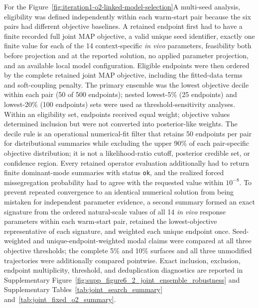 \documentclass[11pt]{article}
\begin{document}
For the Figure~\ref{fig:iteration1-o2-linked-model-selection}A multi-seed analysis, eligibility was defined independently within each warm-start pair because the six pairs had different objective baselines. A retained endpoint first had to have a finite recorded full joint MAP objective, a valid unique seed identifier, exactly one finite value for each of the 14 context-specific \textit{in vivo} parameters, feasibility both before projection and at the reported solution, no applied parameter projection, and an available local model configuration. Eligible endpoints were then ordered by the complete retained joint MAP objective, including the fitted-data terms and soft-coupling penalty. The primary ensemble was the lowest objective decile within each pair (50 of 500 endpoints); nested lowest-5\% (25 endpoints) and lowest-20\% (100 endpoints) sets were used as threshold-sensitivity analyses. Within an eligibility set, endpoints received equal weight; objective values determined inclusion but were not converted into posterior-like weights. The decile rule is an operational numerical-fit filter that retains 50 endpoints per pair for distributional summaries while excluding the upper 90\% of each pair-specific objective distribution; it is not a likelihood-ratio cutoff, posterior credible set, or confidence region. Every retained operator evaluation additionally had to return finite dominant-mode summaries with status \texttt{ok}, and the realized forced missegregation probability had to agree with the requested value within $10^{-8}$. To prevent repeated convergence to an identical numerical solution from being mistaken for independent parameter evidence, a second summary formed an exact signature from the ordered natural-scale values of all 14 \textit{in vivo} response parameters within each warm-start pair, retained the lowest-objective representative of each signature, and weighted each unique endpoint once. Seed-weighted and unique-endpoint-weighted modal claims were compared at all three objective thresholds; the complete 5\% and 10\% surfaces and all three unmodified trajectories were additionally compared pointwise. Exact inclusion, exclusion, endpoint multiplicity, threshold, and deduplication diagnostics are reported in Supplementary Figure~\ref{fig:supp_figure6_2_joint_ensemble_robustness} and Supplementary Tables~\ref{tab:joint_search_summary} and~\ref{tab:joint_fixed_o2_summary}.
\end{document}
